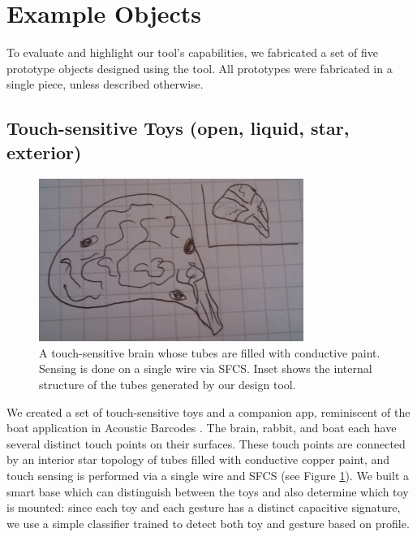 \section{Example Objects}

To evaluate and highlight our tool's capabilities, we fabricated a set of five prototype objects designed using the tool.  All prototypes were fabricated in a single piece, unless described otherwise.


 

\subsection{Touch-sensitive Toys (open, liquid, star, exterior)}

\begin{figure}[h]
\centering
    \includegraphics[width=3.4in]{figures/placeholder/brain.jpg}
\caption{A touch-sensitive brain whose tubes are filled with conductive paint.  Sensing is done on a single wire via SFCS.  Inset shows the internal structure of the tubes generated by our design tool.}
\label{fig:toys}
\end{figure}


We created a set of touch-sensitive toys and a companion app, reminiscent of the boat application in Acoustic Barcodes \cite{Harrison-acoustic}.  The brain, rabbit, and boat each have several distinct touch points on their surfaces.  These touch points are connected by an interior star topology of tubes filled with conductive copper paint, and touch sensing is performed via a single wire and SFCS (see Figure \ref{fig:toys}).  We built a smart base which can distinguish between the toys and also determine which toy is mounted: since each toy and each gesture has a distinct capacitive signature, we use a simple classifier trained to detect both toy and gesture based on profile.

